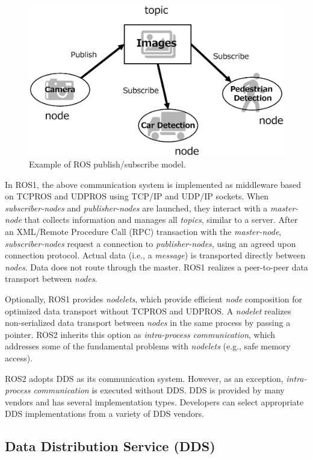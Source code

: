 \documentclass{sig-alternate-05-2015}
\begin{document}
\begin{figure}[t]
\centering
\includegraphics[width=0.8\linewidth]{../figure/ros_pubsub_fig.eps}
\caption{\label{fig:orgparagraph2}
Example of ROS publish/subscribe model.}
\end{figure}

In ROS1, the above communication system is implemented as middleware based on TCPROS and UDPROS using TCP/IP and UDP/IP sockets. 
When \emph{subscriber-nodes} and \emph{publisher-nodes} are launched, they interact with a \emph{master-node} that collects information and manages all \emph{topics}, similar to a server. 
After an XML/Remote Procedure Call (RPC) transaction with the \emph{master-node}, \emph{subscriber-nodes} request a connection to \emph{publisher-nodes}, using an agreed upon connection protocol. 
Actual data (i.e., a \emph{message}) is transported directly between \emph{nodes}. 
Data does not route through the master. 
ROS1 realizes a peer-to-peer data transport between \emph{nodes}. 

Optionally, ROS1 provides \emph{nodelets}, which provide efficient \emph{node} composition for optimized data transport without TCPROS and UDPROS. 
A \emph{nodelet} realizes non-serialized data transport between \emph{nodes} in the same process by passing a pointer. 
ROS2 inherits this option as \emph{intra-process communication}, which addresses some of the fundamental problems with \emph{nodelets} (e.g., safe memory access).

ROS2 adopts DDS as its communication system. However, as an exception, \emph{intra-process communication} is executed without DDS.
DDS is provided by many vendors and has several implementation types.
Developers can select appropriate DDS implementations from a variety of DDS vendors.

\subsection{Data Distribution Service (DDS)}
\label{sec:orgheadline7}
\end{document}
